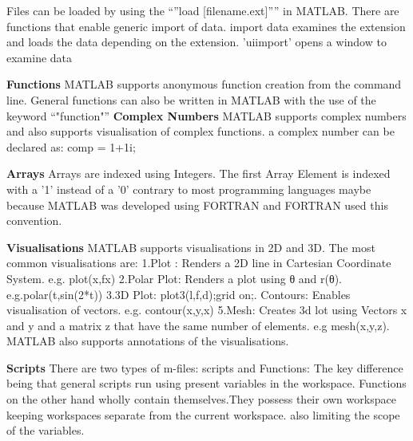 \documentclass[fleqn,letterpaper,12pt]{report}
\begin{document}
Files can be loaded by using the “”load [filename.ext]”” in MATLAB. 
There are functions that enable generic import of data.
import data examines the extension and loads the data depending on the extension.\newline
'uiimport' opens a window to examine data

\textbf{Functions}\newline
MATLAB supports anonymous function creation from the command line.\newline
General functions can also be written in MATLAB with the use of the keyword “"function"”
\newpage
\textbf{Complex Numbers}\newline
MATLAB supports complex numbers and also supports visualisation of complex functions. a complex number can be declared as:\newline
comp = 1+1i;

\textbf{Arrays}\newline
Arrays are indexed using Integers. The first Array Element is indexed with a '1' instead of a '0' contrary to most programming languages maybe because MATLAB was developed using FORTRAN and FORTRAN used this convention.

\textbf{Visualisations}\cite{MATLAB}\newline
MATLAB supports visualisations in 2D and 3D.\newline
The most common visualisations are:\newline
1.Plot : Renders a 2D line in Cartesian Coordinate System. e.g. plot(x,fx)\newline
2.Polar Plot: Renders a plot using θ and r(θ). e.g.\newline polar(t,sin(2*t))\newline
3.3D Plot: plot3(l,f,d);grid on;. Contours: Enables visualisation of vectors. e.g. contour(x,y,x)
5.Mesh: Creates 3d lot using Vectors x and y and a matrix z that have the same number of elements. e.g mesh(x,y,z). MATLAB also supports annotations of the visualisations.

\textbf{Scripts}\newline
There are two types of m-files:\newline
scripts and Functions:\newline
The key difference being that general scripts run using present variables in the workspace. Functions on the other hand wholly contain themselves.They possess their own workspace keeping workspaces separate from the current workspace. also limiting the scope of the variables.
\end{document}
